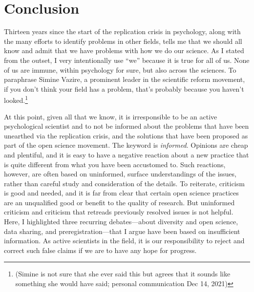 \documentclass[authordate, empirical]{jote-new-article}
\begin{document}
\section{Conclusion}







Thirteen years since the start of the replication crisis in psychology, along with the many efforts to identify problems in other fields, tells me that we should all know and admit that we have problems with how we do our science. As I stated from the outset, I very intentionally use “we” because it is true for all of us. None of us are immune, within psychology for sure, but also across the sciences. To paraphrase Simine Vazire, a prominent leader in the scientific reform movement, if you don't think your field has a problem, that's probably because you haven't looked.\footnote{(Simine is not sure that she ever said this but agrees that it sounds like something she would have said; personal communication Dec 14, 2021)}







At this point, given all that we know, it is irresponsible to be an active psychological scientist and to not be informed about the problems that have been unearthed via the replication crisis, and the solutions that have been proposed as part of the open science movement. The keyword is \emph{informed}. Opinions are cheap and plentiful, and it is easy to have a negative reaction about a new practice that is quite different from what you have been accustomed to. Such reactions, however, are often based on uninformed, surface understandings of the issues, rather than careful study and consideration of the details. To reiterate, criticism is good and needed, and it is far from clear that certain open science practices are an unqualified good or benefit to the quality of research. But uninformed criticism and criticism that retreads previously resolved issues is not helpful. Here, I highlighted three recurring debates—about diversity and open science, data sharing, and preregistration—that I argue have been based on insufficient information. As active scientists in the field, it is our responsibility to reject and correct such false claims if we are to have any hope for progress.






\printbibliography
\end{document}
